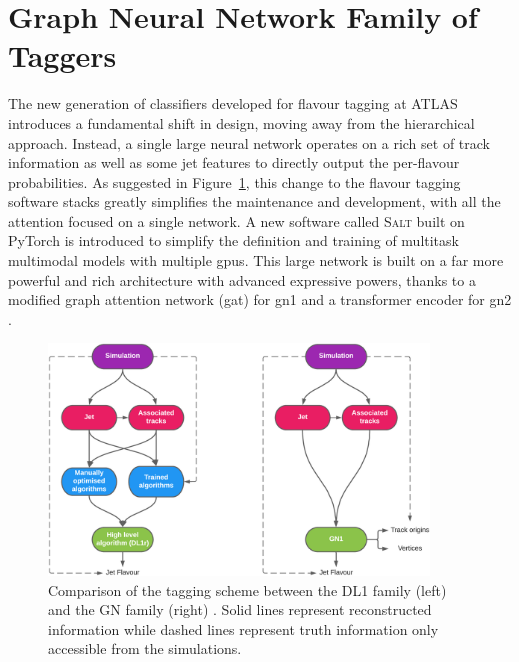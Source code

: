 \section{Graph Neural Network Family of Taggers}\label{chap:GN}
The new generation of classifiers developed for flavour tagging at ATLAS introduces a fundamental shift in design, moving away from the hierarchical approach. Instead, a single large neural network operates on a rich set of track information as well as some jet features to directly output the per-flavour probabilities. As suggested in Figure~\ref{fig:ftagArchi}, this change to the flavour tagging software stacks greatly simplifies the maintenance and development, with all the attention focused on a single network. A new software called \textsc{Salt} \cite{SaltCite} built on PyTorch \cite{pytorch} is introduced to simplify the definition and training of multitask multimodal models with multiple \glspl{gpu}. This large network is built on a far more powerful and rich architecture with advanced expressive powers, thanks to a modified graph attention network (\gls{gat}) \cite{velickovic2018graph, brody2022how} for \gls{gn1} and a transformer encoder for \gls{gn2} \cite{NIPS_transformerPaper}. 

\begin{figure}[h!]
  \center
  \includegraphics[width=0.9\textwidth]{Images/FTAG/GN/Intro/schematics_difference.png}
  \caption{Comparison of the tagging scheme between the DL1 family (left) and the GN family (right) \cite{ATL-PHYS-PUB-2022-027}. Solid lines represent reconstructed information while dashed lines represent truth information only accessible from the simulations.} 
  \label{fig:ftagArchi}
\end{figure}

